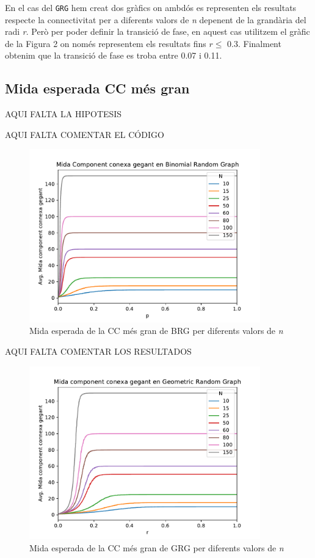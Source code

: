 En el cas del \texttt{GRG} hem creat dos gràfics on ambdós es representen els resultats respecte la connectivitat per a diferents valors de \textit{n} depenent de la grandària del radi \textit{r}. Però per poder definir la transició de fase, en aquest cas utilitzem el gràfic de la Figura 2 on només representem els resultats fins $r\leq$ 0.3. Finalment obtenim que la transició de fase es troba entre 0.07 i 0.11.


\subsection{Mida esperada CC més gran}
AQUI FALTA LA HIPOTESIS

AQUI FALTA COMENTAR EL CÓDIGO

\begin{figure}[H]
    \centering
    \includegraphics[width=10cm]{plots/BRG_midaCompConMax.pdf}
    \caption{Mida esperada de la CC més gran de BRG per diferents valors de \textit{n}}
    \label{fig:connect_04}
\end{figure}

AQUI FALTA COMENTAR LOS RESULTADOS

\begin{figure}[H]
    \centering
    \includegraphics[width=10cm]{plots/GRG_midaCompConMax.pdf}
    \caption{Mida esperada de la CC més gran de GRG per diferents valors de \textit{n}}
    \label{fig:connect_04}
\end{figure}


